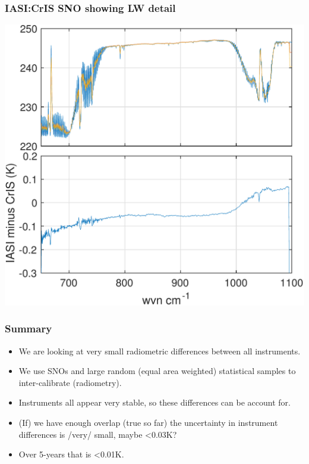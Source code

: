 \documentclass[10pt,t]{beamer}
\begin{document}
\begin{frame}
  \frametitle{IASI:CrIS SNO showing LW detail}
  \begin{center}
    \includegraphics[width=0.8\linewidth]{./Figs/sno_i1c1_2018q1_lr_lw_mean_bias_null.pdf}
  \end{center}
  
\end{frame}
\begin{frame}
  \frametitle{Summary}
  \begin{itemize}
  \item We are looking at very small radiometric differences between all instruments.
  \item We use SNOs and large random (equal area weighted) statistical samples to inter-calibrate (radiometry).
  \item Instruments all appear very stable, so these differences can be account for.
  \item (If) we have enough overlap (true so far) the uncertainty in instrument differences is /very/ small, maybe <0.03K?
  \item Over 5-years that is <0.01K.
    
  \end{itemize}
  
\end{frame}
\end{document}
